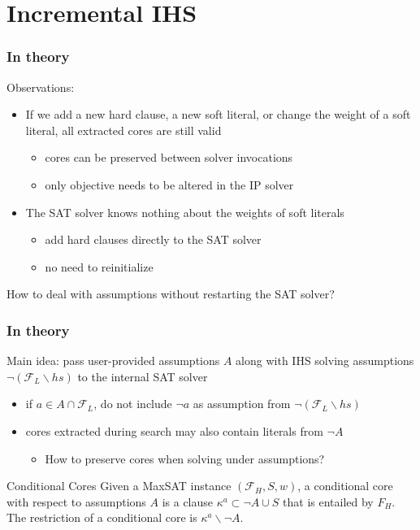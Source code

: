 \documentclass[aspectratio=169 %
,serif,mathserif]{beamer}
\begin{document}
\section{Incremental IHS}
\begin{frame}
	\frametitle{In theory}
	Observations:
	\begin{itemize}
		\item If we add a new hard clause, a new soft literal, or change the weight of a soft literal, all extracted cores are still valid
		\begin{itemize}
			\item cores can be preserved between solver invocations
			\item only objective needs to be altered in the IP solver
		\end{itemize}
		\item The SAT solver knows nothing about the weights of soft literals
		\begin{itemize}
			\item add hard clauses directly to the SAT solver
			\item no need to reinitialize
		\end{itemize}
	\end{itemize} \pause
	How to deal with assumptions without restarting the SAT solver?
\end{frame}



\begin{frame}
	\frametitle{In theory}
	Main idea: pass user-provided assumptions $A$ along with IHS solving assumptions $\neg(\mathcal{F}_L \backslash h s)$ to the internal SAT solver
	\begin{itemize}
		\item if $a \in A \cap \mathcal{F}_L$, do not include $\neg a$ as assumption from $\neg(\mathcal{F}_L \backslash h s)$
		\item cores extracted during search may also contain literals from $\neg A$
		\begin{itemize}
			\item How to preserve cores when solving under assumptions?
		\end{itemize}
	\end{itemize} \pause
	\begin{block}{Conditional Cores}
		Given a MaxSAT instance $\left(\mathcal{F}_H, S, w\right)$, a conditional core with respect to assumptions $A$ is a clause $\kappa^a \subset \neg A \cup S$ that is entailed by $F_H$.
The restriction of a conditional core is $\kappa^a \backslash \neg A$.
	\end{block}
\end{frame}
\end{document}
